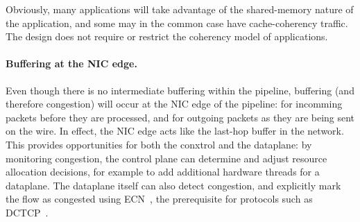 Obviously, many applications will take advantage of the shared-memory
nature of the application, and some may in the common case have
cache-coherency traffic.  The design does not require or restrict the coherency model of applications.

\paragraph{Buffering at the NIC edge.}

Even though there is no intermediate buffering within the pipeline,
buffering (and therefore congestion) will occur at the NIC edge of the
pipeline: for incomming packets before they are processed, and for
outgoing packets as they are being sent on the wire.  In effect, the
NIC edge acts like the last-hop buffer in the network.  This provides
opportunities for both the conxtrol and the dataplane: by monitoring
congestion, the control plane can determine and adjust resource
allocation decisions, for example to add additional hardware threads
for a dataplane.  The dataplane itself can also detect congestion, and
explicitly mark the flow as congested using ECN~\cite{}, the
prerequisite for protocols such as
DCTCP~\cite{DBLP:conf/sigcomm/AlizadehGMPPPSS10}. 

